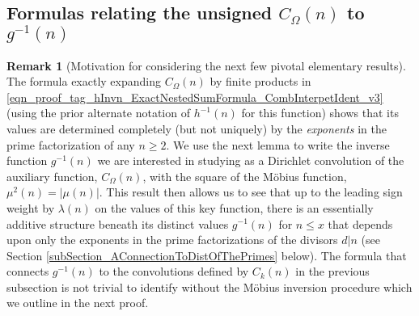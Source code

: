 \documentclass[11pt,reqno,a4letter]{article}
\numberwithin{figure}{section}
\numberwithin{table}{section}
\theoremstyle{plain}
\numberwithin{theorem}{section}
\theoremstyle{definition}
\newtheorem{remark}[theorem]{Remark}
\begin{document}
\subsection{Formulas relating the unsigned $C_{\Omega}(n)$ to $g^{-1}(n)$} 
\label{subSection_Relating_CknFuncs_to_gInvn} 

\begin{remark}[Motivation for considering the next few pivotal elementary results] 
The formula exactly expanding $C_{\Omega}(n)$ by finite products in 
\eqref{eqn_proof_tag_hInvn_ExactNestedSumFormula_CombInterpetIdent_v3} (using the prior 
alternate notation of $h^{-1}(n)$ for this function) shows that its values are  
determined completely (but not uniquely) by the \emph{exponents} 
in the prime factorization of any $n \geq 2$. 
We use the next lemma to write the inverse function $g^{-1}(n)$ we are interested in studying 
as a Dirichlet convolution of the auxiliary function, $C_{\Omega}(n)$, with the square of 
the M\"obius function, $\mu^2(n) = |\mu(n)|$. This result then allows us to see that up to 
the leading sign weight by $\lambda(n)$ on the values of this key function, there is an 
essentially additive structure beneath its distinct values $g^{-1}(n)$ for $n \leq x$ that 
depends upon only the exponents in the prime factorizations of the divisors $d|n$ 
(see Section \ref{subSection_AConnectionToDistOfThePrimes} below). 
The formula that connects $g^{-1}(n)$ to the convolutions defined by $C_k(n)$ in the previous 
subsection is not trivial to identify without the M\"obius inversion procedure which we 
outline in the next proof. 
\end{remark}
\end{document}
